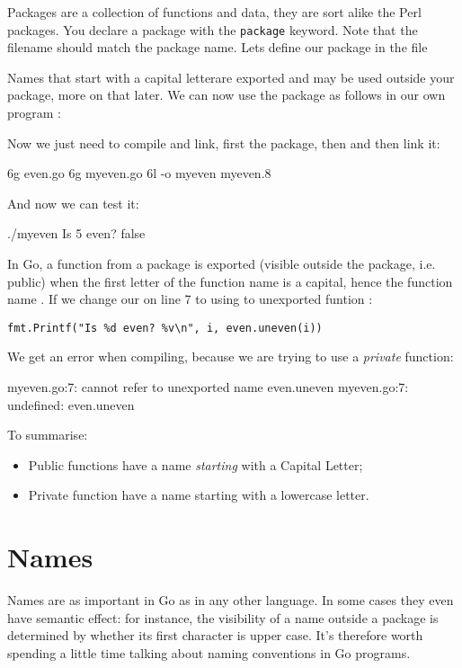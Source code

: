 \noindent{}Packages are a collection of functions and data, they are sort alike the
Perl packages\cite{perl-packages}. You declare a package with the
\lstinline{package} keyword. Note that the filename should
match the package name. Lets define our package  in the file


Names that start with a capital letterare exported and may be used
outside your package, more on that later. We can now use
the package as follows in our own program :


Now we just need to compile and link, first the package, then  and
then link it:
\begin{display}
\pr 6g even.go			\qquad\qquad{}
\pr 6g myeven.go		\qquad\qquad{}
\pr 6l -o myeven myeven.8
\end{display}
And now we can test it:
\begin{display}
\pr ./myeven
Is 5 even? false
\end{display}

In Go, a function from a package is exported (visible
outside the package, i.e. public) when the first letter of the function name is a capital, hence
the function name . If we change our  on line
7 to using to unexported funtion :

\noindent\lstinline{fmt.Printf("Is %d even? %v\n", i, even.uneven(i))}

\noindent We get an error when compiling, because we are trying to use a
\emph{private} function:
\begin{display}
myeven.go:7: cannot refer to unexported name even.uneven
myeven.go:7: undefined: even.uneven
\end{display}
\noindent{}To summarise:
\begin{itemize}
\item Public functions have a name \emph{starting} with a Capital
Letter;
\item Private function have a name starting with a lowercase letter.
\end{itemize}

\section{Names}
Names are as important in Go as in any other language. In some cases
they even have semantic effect: for instance, the visibility of a name
outside a package is determined by whether its first character is upper
case. It's therefore worth spending a little time talking about naming
conventions in Go programs.

